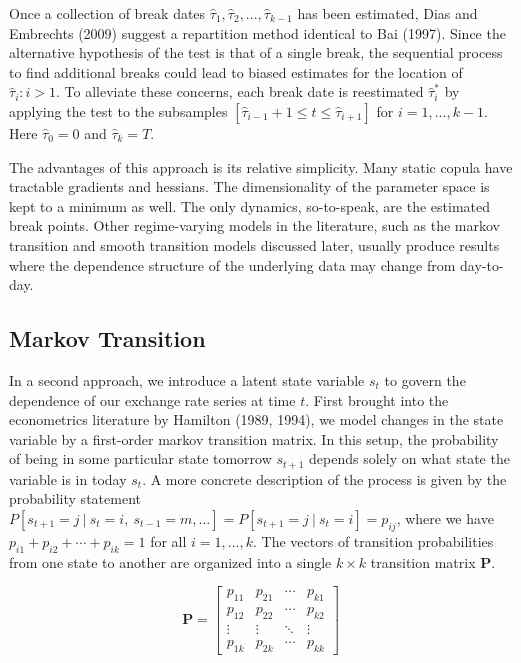 \documentclass[12pt]{article}
\begin{document}
Once a collection of break dates $\hat{\tau}_{1},\hat{\tau}_{2},...,\hat{\tau}_{k-1}$ has been estimated, Dias and Embrechts (2009) suggest a repartition method identical to Bai (1997). Since the alternative hypothesis of the test is that of a single break, the sequential process to find additional breaks could lead to biased estimates for the location of $\hat{\tau}_{i}:i > 1$. To alleviate these concerns, each break date is reestimated $\hat{\tau}_{i}^{\ast}$ by applying the test to the subsamples $\left[ \hat{\tau}_{i-1}+1\leq t\leq \hat{\tau}_{i+1}\right]$ for $i=1,...,k-1$. Here $\hat{\tau}_{0} = 0$ and $\hat{\tau}_{k} = T$.

The advantages of this approach is its relative simplicity. Many static copula have tractable gradients and hessians. The dimensionality of the parameter space is kept to a minimum as well. The only dynamics, so-to-speak, are the estimated break points. Other regime-varying models in the literature, such as the markov transition and smooth transition models discussed later, usually produce results where the dependence structure of the underlying data may change from day-to-day.

\subsection{Markov Transition}

In a second approach, we introduce a latent state variable $s_{t}$ to govern the dependence of our exchange rate series at time $t$. First brought into the econometrics literature by Hamilton (1989, 1994), we model changes in the state variable by a first-order markov transition matrix. In this setup, the probability of being in some particular state tomorrow $s_{t+1}$ depends solely on what state the variable is in today $s_{t}$. A more concrete description of the process is given by the probability statement $P\left[s_{t + 1} = j~|~s_{t}=i,~s_{t-1} = m,\ldots \right] = P\left[s_{t+1}=j~|~s_{t} = i\right] = p_{ij}$, where we have $p_{i1} + p_{i2} + \cdots + p_{ik}=1$ for all $i = 1,...,k$. The vectors of transition probabilities from one state to another are organized into a single $k\times k$ transition matrix $\mathbf{P}$.

\begin{equation}
\mathbf{P}=\left[ 
\begin{array}{cccc}
p_{11} & p_{21} & \cdots & p_{k1} \\ 
p_{12} & p_{22} & \cdots & p_{k2} \\ 
\vdots & \vdots & \ddots & \vdots \\ 
p_{1k} & p_{2k} & \cdots & p_{kk}
\end{array}
\right]
\end{equation}
\end{document}
